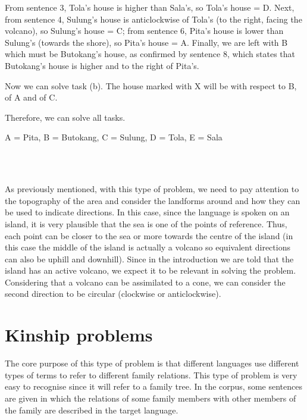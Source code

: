 \begin{refsection}
\begin{mysolution}
From sentence 3, Tola's house is higher than Sala's, so Tola's house = D. Next, from sentence 4, Sulung's house is anticlockwise of Tola's (to the right, facing the volcano), so Sulung's house = C; from sentence 6, Pita's house is lower than Sulung's (towards the shore), so Pita's house = A. Finally, we are left with B which must be Butokang's house, as confirmed by sentence 8, which states that Butokang's house is higher and to the right of Pita's.

Now we can solve task (b). The house marked with X will be  with respect to B,  of A and  of C.

Therefore, we can solve all tasks.

\begin{solutions}
    \item A = Pita, B = Butokang, C = Sulung, D = Tola, E = Sala
    \item {}\\
    \\
\end{solutions}
\end{mysolution}

As previously mentioned, with this type of problem, we need to pay attention to the topography of the area and consider the landforms around and how they can be used to indicate directions. In this case, since the language is spoken on an island, it is very plausible that the sea is one of the points of reference. Thus, each point can be closer to the sea or more towards the centre of the island (in this case the middle of the island is actually a volcano so equivalent directions can also be uphill and downhill). Since in the introduction we are told that the island has an active volcano, we expect it to be relevant in solving the problem. Considering that a volcano can be assimilated to a cone, we can consider the second direction to be circular (clockwise or anticlockwise).

\section{Kinship problems}

The core purpose of this type of problem is that different languages use different types of terms to refer to different family relations. This type of problem is very easy to recognise since it will refer to a family tree. In the corpus, some sentences are given in which the relations of some family members with other members of the family are described in the target language.


\end{refsection}
